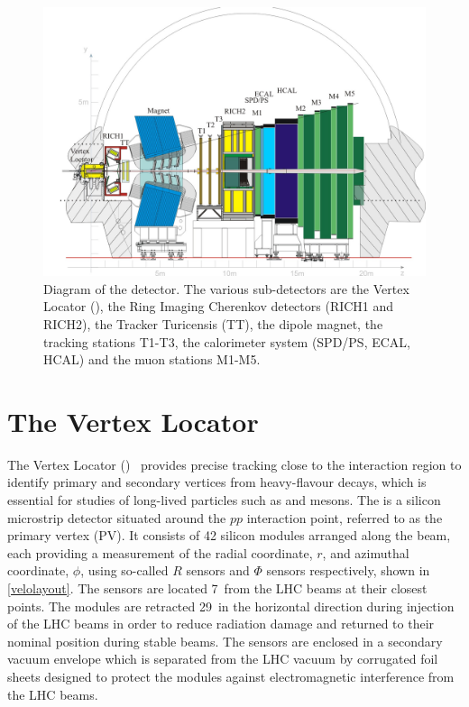\begin{figure}
\includegraphics[width=\linewidth]{figures/detector/lhcb.pdf}
\caption{Diagram of the \lhcb detector. The various sub-detectors are the Vertex Locator (\velo), the Ring Imaging Cherenkov detectors (RICH1 and RICH2), the Tracker Turicensis (TT), the dipole magnet, the tracking stations T1-T3, the calorimeter system (SPD/PS, ECAL, HCAL) and the muon stations M1-M5.}
\label{lhcbdetector}
\end{figure}

\section{The Vertex Locator}
\label{sec:detector:velo}

The Vertex Locator (\velo)~\cite{LHCb-DP-2014-001} provides precise tracking close to the \lhcb interaction region to identify primary and secondary vertices from heavy-flavour decays, which is essential for studies of long-lived particles such as \B and \D mesons. The \velo is a silicon microstrip detector situated around the $pp$ interaction point, referred to as the primary vertex (PV). It consists of 42 silicon modules arranged along the beam, each providing a measurement of the radial coordinate, $r$, and azimuthal coordinate, $\phi$, using so-called $R$ sensors and $\Phi$ sensors respectively, shown in \fig\ref{velolayout}. The sensors are located 7~\mm from the LHC beams at their closest points. The \velo modules are retracted 29~\mm in the horizontal direction during injection of the LHC beams in order to reduce radiation damage and returned to their nominal position during stable beams. The sensors are enclosed in a secondary vacuum envelope which is separated from the LHC vacuum by corrugated foil sheets designed to protect the \velo modules against electromagnetic interference from the LHC beams.


